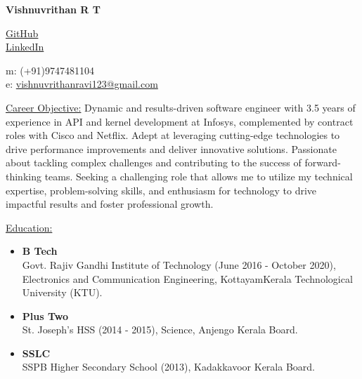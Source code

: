 \documentclass[letterpaper,11pt]{article}
\begin{document}
	\onehalfspacing
	\textbf{\LARGE Vishnuvrithan R T} \\ \vspace{1pt}
	
	\begin{center}
		\begin{multicols}{2}
			\begin{flushleft}
				\href{{https://github.com/vishnuvrithan/}}{GitHub}\\
				\href{{https://www.linkedin.com/in/vishnuvrithan-r-352a37193/}}{LinkedIn}
			\end{flushleft}
			
			\begin{flushright}
				m: (+91)9747481104\\
				e: \url{vishnuvrithanravi123@gmail.com}
			\end{flushright}
		\end{multicols}
	\end{center}
	
	\underline{\large Career Objective:}
	\newline
	Dynamic and results-driven software engineer with 3.5 years of experience in API and kernel development at Infosys, complemented by contract roles with Cisco and Netflix. Adept at leveraging cutting-edge technologies to drive performance improvements and deliver innovative solutions. Passionate about tackling complex challenges and contributing to the success of forward-thinking teams. Seeking a challenging role that allows me to utilize my technical expertise, problem-solving skills, and enthusiasm for technology to drive impactful results and foster professional growth.
	
	\underline{\large Education:}
	\begin{itemize}
		\item \textbf{B Tech}\\
		Govt. Rajiv Gandhi Institute of Technology (June 2016 - October 2020), Electronics and Communication Engineering, Kottayam\tab Kerala Technological University (KTU).\\
		\item \textbf{Plus Two}\\
		St. Joseph's HSS (2014 - 2015), Science, Anjengo \tab Kerala Board.\\
		\item \textbf{SSLC}\\
		SSPB Higher Secondary School (2013), Kadakkavoor \tab Kerala Board.
	\end{itemize}
	
\end{document}
